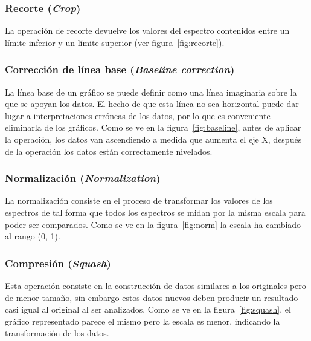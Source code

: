 \subsubsection{Recorte (\textit{Crop})}

La operación de recorte devuelve los valores del espectro contenidos entre un
límite inferior y un límite superior (ver figura~\ref{fig:recorte}).


\subsubsection{Corrección de línea base (\textit{Baseline correction})}

La línea base de un gráfico se puede definir como una línea imaginaria sobre la
que se apoyan los datos. El hecho de que esta línea no sea horizontal puede dar 
lugar a interpretaciones erróneas de los datos, por lo que es conveniente 
eliminarla de los gráficos. Como se ve en la figura~\ref{fig:baseline}, antes 
de aplicar la operación, los datos van ascendiendo a medida que aumenta el eje 
X, después de la operación los datos están correctamente nivelados.


\subsubsection{Normalización (\textit{Normalization})}

La normalización consiste en el proceso de transformar los valores de los
espectros de tal forma que todos los espectros se midan por la misma escala para
poder ser comparados. Como se ve en la figura~\ref{fig:norm} la escala ha
cambiado al rango (0, 1).


\subsubsection{Compresión (\textit{Squash})}

Esta operación consiste en la construcción de datos similares a los originales
pero de menor tamaño, sin embargo estos datos nuevos deben producir un resultado
casi igual al original al ser analizados. Como se ve en la
figura~\ref{fig:squash}, el gráfico representado parece el mismo pero la escala
es menor, indicando la transformación de los datos.


